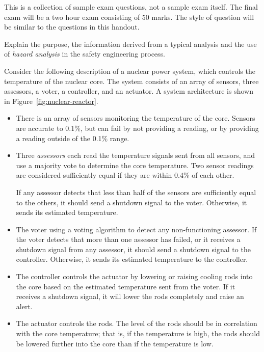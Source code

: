 This is a collection of sample exam questions, not a sample exam itself. The final exam will be a two hour exam consisting of 50 marks. The style of question will be similar to the questions in this handout.



Explain the purpose, the information derived from a typical analysis and the use of {\em hazard analysis} in the safety engineering process.


Consider the following description of a nuclear power system, which controls the temperature of the nuclear core. The system consists of an array of sensors, three assessors, a voter, a controller, and an actuator. A system architecture is shown in Figure~\ref{fig:nuclear-reactor}.

\begin{itemize}

 \item There is an array of sensors monitoring the temperature of the core. Sensors are accurate to 0.1\%, but can fail by not providing a reading, or by providing a reading outside of the 0.1\% range.

 \item Three {\em assessors} each read the temperature signals sent from all sensors, and use a majority vote to determine the core temperature. Two sensor readings are considered sufficiently equal if they are within 0.4\% of each other.

 If any assessor detects that less than half of the sensors are sufficiently equal to the others, it should send a shutdown signal to the voter. Otherwise, it sends its estimated temperature.

 \item The voter using a voting algorithm to detect any non-functioning assessor. If the voter detects that more than one assessor has failed, or it receives a shutdown signal from any assessor, it should send a shutdown signal to the controller. Otherwise, it sends its estimated temperature to the controller.

 \item The controller controls the actuator by lowering or raising cooling rods into the core based on the estimated temperature sent from the voter. If it receives a shutdown signal, it will lower the rods completely and raise an alert.

 \item The actuator controls the rods. The level of the rods should be in correlation with the core temperature; that is, if the temperature is high, the rods should be lowered further into the core than if the temperature is low.

\end{itemize}

